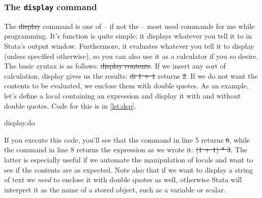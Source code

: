 \subsubsection{The \texttt{display} command}
The \st{display} command is one of -- if not the -- most used commands for me while programming.
It's function is quite simple: it displays whatever you tell it to in Stata's output window.
Furthermore, it evaluates whatever you tell it to display (unless specified otherwise),
so you can also use it as a calculator if you so desire.
The basic syntax is as follows: \st{display contents}.
If we insert any sort of calculation, display gives us the results:
\st{di 1 + 1} returns \st{2}.
If we do not want the contents to be evaluated, we enclose them with double quotes.
As an example,
let's define a local containing an expression and display it with and without double quotes.
Code for this is in \cref{lst:dsp}.

\begin{listing}[htp]
\caption{display.do}\label{lst:dsp}
\end{listing}

If you execute this code, you'll see that the command in line 5 returns \st{6},
while the command in line 8 returns the expression as we wrote it:
\st{(1 + 1) * 3}.
The latter is especially useful if we automate the manipulation of locals and want to see if the contents are as expected.
Note also that if we want to display a string of text we \emph{need} to enclose it with double quotes as well,
otherwise Stata will interpret it as the name of a stored object,
such as a variable or scalar.


